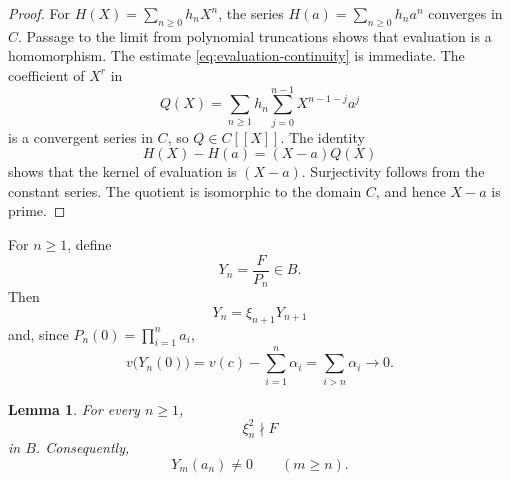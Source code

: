 \documentclass[12pt]{amsart}
\newtheorem{lemma}[theorem]{Lemma}
\theoremstyle{plain}
\begin{document}
\begin{proof}
For $H(X)=\sum_{n\geq0}h_nX^n$, the series
$H(a)=\sum_{n\geq0}h_na^n$ converges in $C$.  Passage to the limit from
polynomial truncations shows that evaluation is a homomorphism.  The estimate
\eqref{eq:evaluation-continuity} is immediate.  The coefficient of
$X^r$ in
\[
  Q(X)=\sum_{n\geq1}h_n\sum_{j=0}^{n-1}X^{n-1-j}a^j
\]
is a convergent series in $C$, so $Q\in C[[X]]$.  The identity
\[
  H(X)-H(a)=(X-a)Q(X)
\]
shows that the kernel of evaluation is $(X-a)$.  Surjectivity follows
from the constant series.  The quotient is isomorphic to the domain
$C$, and hence $X-a$ is prime.
\end{proof}

For $n\geq1$, define
\begin{equation}\label{eq:Yn}
  Y_n=\frac{F}{P_n}\in B.
\end{equation}
Then
\begin{equation}\label{eq:Y-recursion}
  Y_n=\xi_{n+1}Y_{n+1}
\end{equation}
and, since $P_n(0)=\prod_{i=1}^na_i$,
\begin{equation}\label{eq:Y-constant-values}
  v\bigl(Y_n(0)\bigr)
  =v(c)-\sum_{i=1}^n\alpha_i
  =\sum_{i>n}\alpha_i
  \longrightarrow0.
\end{equation}

\begin{lemma}\label{lem:simple-linear-factors}
For every $n\geq1$,
\[
  \xi_n^2\nmid F
\]
in $B$.  Consequently,
\begin{equation}\label{eq:Ym-nonzero-evaluation}
  Y_m(a_n)\neq0
  \qquad(m\geq n).
\end{equation}
\end{lemma}
\end{document}
